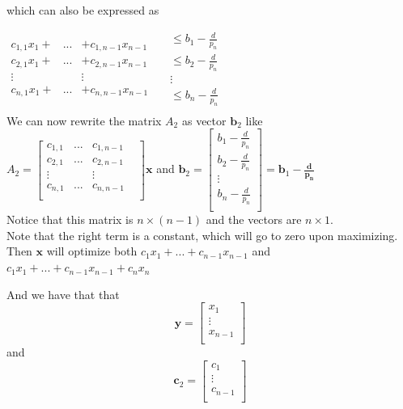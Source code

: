 \documentclass[letterpaper,12pt]{article}
\theoremstyle{definition}
\begin{document}
which can also be expressed as 

$\begin{matrix}
    c_{1,1} x_1 + &...& + c_{1,n-1} x_{n-1} &  \\
    c_{2,1} x_1 + &...& + c_{2,n-1} x_{n-1} &  \\
    \vdots & &\vdots    \\
    c_{n,1} x_1 + &...& + c_{n,n-1} x_{n-1} &  \\
\end{matrix}$
$\begin{matrix}
\leq b_1 - \frac{d}{p_n}\\
\leq b_2 - \frac{d}{p_n}\\
\vdots\\
\leq b_{n} - \frac{d}{p_n}\\
\end{matrix}$\\


\noindent We can now rewrite the matrix $A_2$ as vector $\mathbf{b}_2$ like\\
$A_2= 
\begin{bmatrix}
    c_{1,1}   &...& c_{1,n-1} &  \\
    c_{2,1}   &...&  c_{2,n-1} &  \\
    \vdots & &\vdots    \\
    c_{n,1}   &...&  c_{n,n-1} &  \\
\end{bmatrix} \mathbf{x}$   and    $\mathbf{b}_2 = 
\begin{bmatrix}
 b_1 - \frac{d}{p_n}\\
 b_2 - \frac{d}{p_n}\\
\vdots\\
 b_{n} - \frac{d}{p_n}\\
\end{bmatrix} = \mathbf{b}_1 -  \mathbf{\frac{d}{p_n}}$\\

Notice that this matrix is $n \times (n-1)$ and the vectors are $n \times 1$.\\

Note that the right term is a constant, which will go to zero upon maximizing. Then $\mathbf{x}$ will optimize both $c_1x_1 +...+ c_{n-1}x_{n-1}$ and $c_1x_1 +...+ c_{n-1}x_{n-1} + c_nx_n$

And we have that that \[\mathbf{y} = \begin{bmatrix}

x_1\\
\vdots\\
x_{n-1}\\
\end{bmatrix}\] and \[\mathbf{c}_2 = \begin{bmatrix}
c_1\\
\vdots\\
c_{n-1}\\
\end{bmatrix}\] \\
\end{document}
